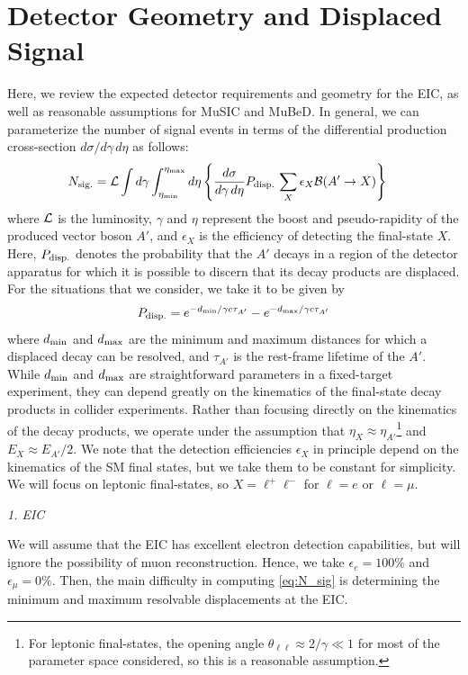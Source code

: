 \section{Detector Geometry and Displaced Signal}\label{sec:detector_geom}
Here, we review the expected detector requirements and geometry for the EIC, as well as reasonable assumptions for MuSIC and MuBeD. In general, we can parameterize the number of signal events in terms of the differential production cross-section $d\sigma/d\gamma\,d\eta$ as follows:
\begin{align}
    N_{\rm sig.} &= {\cal L}\int{d\gamma\int_{\eta_{\rm min}}^{\eta_{\rm max}}{d\eta\left\{\frac{d\sigma}{d\gamma\,d\eta}P_{\rm disp.}\,\sum_{X}\epsilon_X {\cal B}(A'\rightarrow X)\right\}}}\label{eq:N_sig}
\end{align}
where ${\cal L}$ is the luminosity, $\gamma$ and $\eta$ represent the boost and pseudo-rapidity of the produced vector boson $A'$, and $\epsilon_X$ is the efficiency of detecting the final-state $X$. Here, $P_{\rm disp.}$ denotes the probability that the $A'$ decays in a region of the detector apparatus for which it is possible to discern that its decay products are displaced. For the situations that we consider, we take it to be given by
\begin{align}
    P_{\rm disp.} = e^{-d_{\rm min}/\gamma c \tau_{\tiny A'}} - e^{-d_{\rm max}/\gamma c \tau_{\tiny A'}}\label{eq:pdisp}
\end{align}
where  $d_{\rm min}$ and $d_{\rm max}$ are the minimum and maximum distances for which a displaced decay can be resolved, and $\tau_{A'}$ is the rest-frame lifetime of the $A'$. While $d_{\rm min}$ and $d_{\rm max}$ are straightforward parameters in a fixed-target experiment, they can depend greatly on the kinematics of the final-state decay products in collider experiments. Rather than focusing directly on the kinematics of the decay products, we operate under the assumption that $\eta_{X} \approx \eta_{A'}$\footnote{For leptonic final-states, the opening angle $\theta_{\ell\ell} \approx 2/\gamma \ll 1$ for most of the parameter space considered, so this is a reasonable assumption.} and $E_X \approx E_{A'}/2$. We note that the detection efficiencies $\epsilon_X$ in principle depend on the kinematics of the SM final states, but we take them to be constant for simplicity. We will focus on leptonic final-states, so $X = \ell^+\ell^-$ for $\ell = e$ or $\ell = \mu$.


\begin{center}
    {\it 1. EIC}
\end{center}
We will assume that the EIC has excellent electron detection capabilities, but will ignore the possibility of muon reconstruction. Hence, we take $\epsilon_e = 100\%$ and $\epsilon_\mu = 0\%$. Then, the main difficulty in computing \ref{eq:N_sig} is determining the minimum and maximum resolvable displacements at the EIC.

